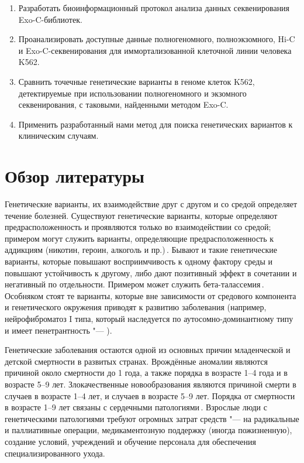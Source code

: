 \documentclass[a4paper,14pt]{extarticle}
\newcommand{\ecitep}[1]{\textenglish{\citep{#1}}}
\begin{document}
\begin{enumerate}
	\item Разработать биоинформационный протокол анализа данных секвенирования Exo-C\hyp{}библиотек.
	\item Проанализировать доступные данные полногеномного, полноэкзомного, Hi-C и Exo-C\hyp{}секвенирования для иммортализованной клеточной линии человека K562.
	\item Сравнить точечные генетические варианты в геноме клеток K562, детектируемые при использовании полногеномного и экзомного секвенирования, с таковыми, найденными методом Exo-C.
	\item Применить разработанный нами метод для поиска генетических вариантов к клиническим случаям.​
\end{enumerate}

\section{Обзор литературы}

Генетические варианты, их взаимодействие друг с другом и со средой определяет течение болезней.
Существуют генетические варианты, которые определяют предрасположенность и проявляются только во взаимодействии со средой; примером могут служить варианты, определяющие предрасположенность к аддикциям (никотин, героин, алкоголь и пр.)\,\ecitep{Hiroi_2004}.
Бывают и такие генетические варианты, которые повышают восприимчивость к одному фактору среды и повышают устойчивость к другому, либо дают позитивный эффект в сочетании и негативный по отдельности.
Примером может служить бета-талассемия\,\ecitep{Galanello_2010}.
Особняком стоят те варианты, которые вне зависимости от средового компонента и генетического окружения приводят к развитию заболевания (например, нейрофиброматоз I типа, который наследуется по аутосомно-доминантному типу и имеет  пенетрантность "--- \citealp{Jett_2009}).

Генетические заболевания остаются одной из основных причин младенческой и детской смертности в развитых странах.
Врождённые аномалии являются причиной около  смертности до 1 года, а также порядка  в возрасте 1--4 года и  в возрасте 5--9 лет.
Злокачественные новообразования являются причиной смерти в  случаев в возрасте 1--4 лет, и  случаев в возрасте 5--9 лет.
Порядка  от смертности в возрасте 1--9 лет связаны с сердечными патологиями\,\ecitep{Field_2003}.
Взрослые люди с генетическими патологиями требуют огромных затрат средств "--- на радикальные и паллиативные операции, медикаментозную поддержку (иногда пожизненную), создание условий, учреждений и обучение персонала для обеспечения специализированного ухода.
\end{document}
